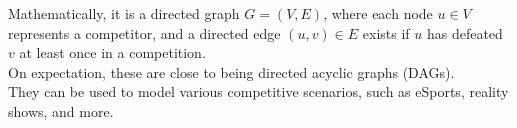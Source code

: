 \documentclass[preview]{standalone}
\begin{document}
Mathematically, it is a directed graph $G = (V, E)$, where each node $u \in V$ represents a competitor, and a directed edge $(u, v) \in E$ exists if $u$ has defeated $v$ at least once in a competition.\\On expectation, these are close to being directed acyclic graphs (DAGs).\\They can be used to model various competitive scenarios, such as eSports, reality shows, and more.\\
\end{document}
